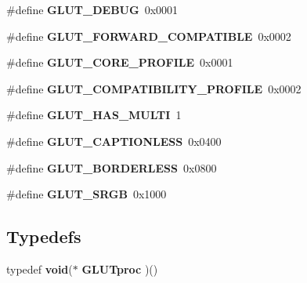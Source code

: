 \begin{DoxyCompactItemize}
\item 
\#define {\bf G\+L\+U\+T\+\_\+\+D\+E\+B\+U\+G}~0x0001
\item 
\#define {\bf G\+L\+U\+T\+\_\+\+F\+O\+R\+W\+A\+R\+D\+\_\+\+C\+O\+M\+P\+A\+T\+I\+B\+L\+E}~0x0002
\item 
\#define {\bf G\+L\+U\+T\+\_\+\+C\+O\+R\+E\+\_\+\+P\+R\+O\+F\+I\+L\+E}~0x0001
\item 
\#define {\bf G\+L\+U\+T\+\_\+\+C\+O\+M\+P\+A\+T\+I\+B\+I\+L\+I\+T\+Y\+\_\+\+P\+R\+O\+F\+I\+L\+E}~0x0002
\item 
\#define {\bf G\+L\+U\+T\+\_\+\+H\+A\+S\+\_\+\+M\+U\+L\+T\+I}~1
\item 
\#define {\bf G\+L\+U\+T\+\_\+\+C\+A\+P\+T\+I\+O\+N\+L\+E\+S\+S}~0x0400
\item 
\#define {\bf G\+L\+U\+T\+\_\+\+B\+O\+R\+D\+E\+R\+L\+E\+S\+S}~0x0800
\item 
\#define {\bf G\+L\+U\+T\+\_\+\+S\+R\+G\+B}~0x1000
\end{DoxyCompactItemize}
\subsection*{Typedefs}
\begin{DoxyCompactItemize}
\item 
typedef {\bf void}($\ast$ {\bf G\+L\+U\+Tproc} )()
\end{DoxyCompactItemize}
